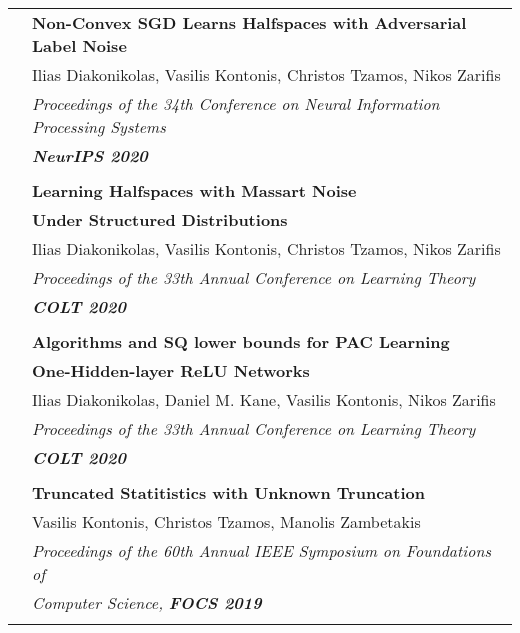 \documentclass[letterpaper,11pt,oneside]{article}
\begin{document}
\begin{longtable}{@{} l l}
     &\textbf{Non-Convex SGD Learns Halfspaces with Adversarial Label Noise} \\
     & Ilias Diakonikolas, Vasilis Kontonis, Christos Tzamos, Nikos Zarifis \\
     & \emph{Proceedings of the 34th Conference on Neural Information Processing Systems} \\
     & \emph{\textbf{NeurIPS 2020}} \\
     & \\

     &\textbf{Learning Halfspaces with Massart Noise}\\
     &\textbf{Under Structured Distributions}\\
     & Ilias Diakonikolas, Vasilis Kontonis, Christos Tzamos, Nikos Zarifis \\
     & \emph{Proceedings of the 33th Annual Conference on Learning Theory} \\
     & \emph{\textbf{COLT 2020}} \\
     & \\

     &\textbf{Algorithms and SQ lower bounds for PAC Learning} \\
     & \textbf{One-Hidden-layer ReLU Networks}\\
     & Ilias Diakonikolas, Daniel M. Kane, Vasilis Kontonis, Nikos Zarifis \\
     & \emph{Proceedings of the 33th Annual Conference on Learning Theory} \\
     & \emph{\textbf{COLT 2020}} \\
     & \\

     & \textbf{Truncated Statitistics with Unknown Truncation} \\
     & Vasilis Kontonis, Christos Tzamos, Manolis Zambetakis\\
     & \emph{Proceedings of the 60th Annual IEEE Symposium on Foundations of}\\
     & \emph{Computer Science, \textbf{FOCS 2019}}\\
     & \\



\end{longtable}
\end{document}
